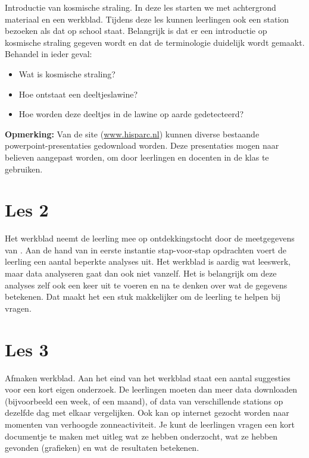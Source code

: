 Introductie van kosmische straling. In deze les starten we met
achtergrond materiaal en een werkblad. Tijdens deze les kunnen
leerlingen ook een station bezoeken als dat op school staat. Belangrijk
is dat er een introductie op kosmische straling gegeven wordt en dat de
terminologie duidelijk wordt gemaakt.
Behandel in ieder geval:

\begin{itemize}
  \item Wat is kosmische straling?
  \item Hoe ontstaat een deeltjeslawine?
  \item Hoe worden deze deeltjes in de lawine op aarde gedetecteerd?
\end{itemize}

\textbf{Opmerking:}
Van de \hisparc site (\url{www.hisparc.nl}) kunnen diverse bestaande
powerpoint-presentaties gedownload worden. Deze presentaties mogen naar
believen aangepast worden, om door leerlingen en docenten in de klas te
gebruiken.


\section{Les 2}

Het werkblad neemt de leerling mee op ontdekkingstocht door de
meetgegevens van \hisparc. Aan de hand van in eerste instantie
stap-voor-stap opdrachten voert de leerling een aantal beperkte analyses
uit. Het werkblad is aardig wat leeswerk, maar data analyseren gaat dan
ook niet vanzelf. Het is belangrijk om deze analyses zelf ook een keer uit
te voeren en na te denken over wat de gegevens betekenen. Dat maakt het
een stuk makkelijker om de leerling te helpen bij vragen.


\section{Les 3}

Afmaken werkblad. Aan het eind van het werkblad staat een aantal
suggesties voor een kort eigen onderzoek. De leerlingen moeten dan meer
data downloaden (bijvoorbeeld een week, of een maand), of data van
verschillende stations op dezelfde dag met elkaar vergelijken. Ook kan op
internet gezocht worden naar momenten van verhoogde zonneactiviteit. Je
kunt de leerlingen vragen een kort documentje te maken met uitleg wat ze
hebben onderzocht, wat ze hebben gevonden (grafieken) en wat de resultaten
betekenen.


%


